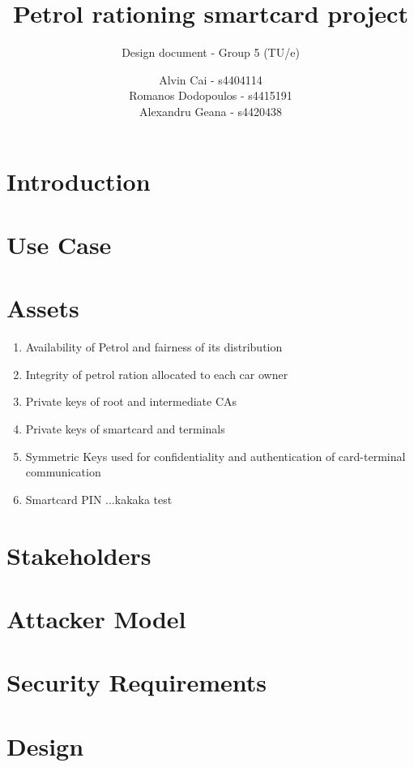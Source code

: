 \documentclass[a4paper,10pt]{llncs}
\title{Petrol rationing smartcard project}
\subtitle{Design document - Group 5 (TU/e)}
\author{Alvin Cai - s4404114 \\ Romanos Dodopoulos - s4415191 \\ Alexandru Geana - s4420438}
\institute{}
\begin{document}
\maketitle

\section{Introduction}


\section{Use Case}


\section{Assets}

\begin{enumerate}
  \item Availability of Petrol and fairness of its distribution
  \item Integrity of petrol ration allocated to each car owner
  \item Private keys of root and intermediate CAs
  \item Private keys of smartcard and terminals
  \item Symmetric Keys used for confidentiality and authentication of card-terminal communication
  \item Smartcard PIN ...kakaka test
\end{enumerate}

\section{Stakeholders}


\section{Attacker Model}


\section{Security Requirements}


\section{Design}
\end{document}
